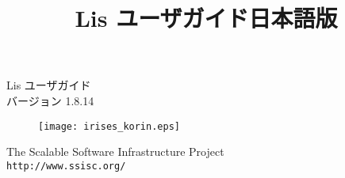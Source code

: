\documentclass[a4paper]{jarticle}
\title{Lis ユーザガイド日本語版}
\author{}
\date{}
\begin{document}
\vspace*{4cm}
\begin{flushleft}
{\Large Lis ユーザガイド}\\
バージョン 1.8.14
\end{flushleft}

\vspace*{2cm}
\begin{figure}[h]
\texttt{[image: irises\_korin.eps]}
\end{figure}

\vspace*{2cm}
\begin{flushleft}
{\large The Scalable Software Infrastructure
Project\\
{\tt http://www.ssisc.org/}}\\
\end{flushleft}

\vspace*{5mm}
\thispagestyle{empty}
\end{document}
